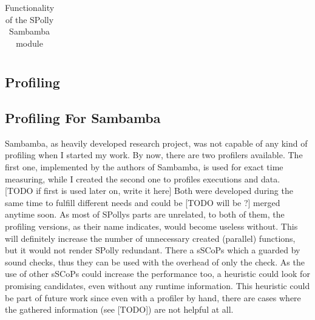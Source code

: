 \begin{table}[htbp]
  \caption{Functionality of the SPolly Sambamba module}
  \begin{tabular}{| l |}
    \hline
    
    \hline
    \hline

    \hline
  \end{tabular}
\end{table}


\begin{shaded}

\subsection{Profiling}

\end{shaded}

\orange
\begin{shaded}
\section{Profiling For Sambamba}

Sambamba, as heavily developed research project, was not capable of any kind
of profiling when I started my work. By now, there are two profilers available.
The first one, implemented by the authors of Sambamba, 
is used for exact time measuring, while I created the second one to profiles
executions and data.
[TODO if first is used later on, write it here] Both were
developed during the same time to fulfill different needs and could be
[TODO will be ?]  merged anytime soon. 
As most of SPollys parts are unrelated, to both of them, 
the profiling versions, as their name indicates, would become useless without.
This will definitely increase the number of unnecessary created (parallel) 
functions, but it would not render SPolly redundant.
There a sSCoPs which a guarded by sound checks, thus they can be used with the
overhead of only the check. As the use of other sSCoPs could increase the 
performance too, a heuristic could look for promising candidates, even without
any runtime information. This heuristic could be part of future work since even
with a profiler by hand, there are cases where the gathered information
(see [TODO]) are not helpful at all.

\end{shaded}


